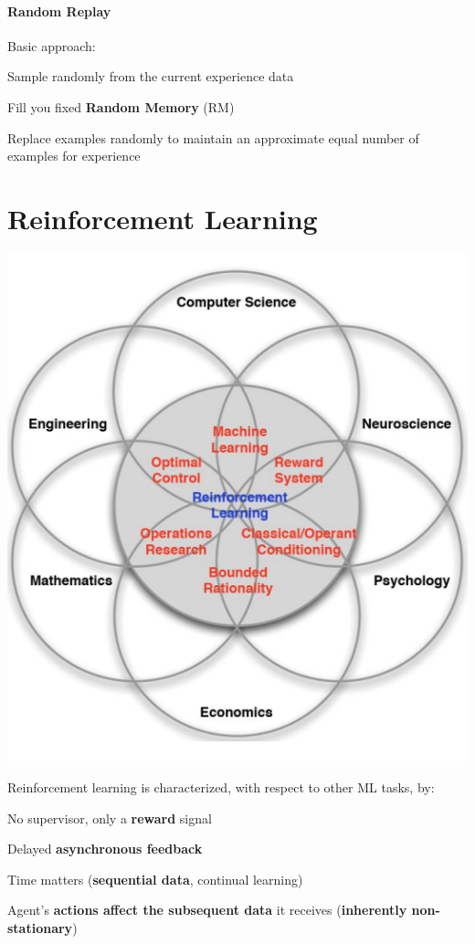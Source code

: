 \documentclass[10pt]{report}
\begin{document}
\paragraph{Random Replay} Basic approach:
\begin{list}{}{}
	\item Sample randomly from the current experience data
	\item Fill you fixed \textbf{Random Memory} (RM)
	\item Replace examples randomly to maintain an approximate equal number of examples for experience
\end{list}
\section{Reinforcement Learning}
\begin{center}
	\includegraphics[scale=0.5]{214.png}
\end{center}
Reinforcement learning is characterized, with respect to other ML tasks, by:
\begin{list}{}{}
	\item No supervisor, only a \textbf{reward} signal
	\item Delayed \textbf{asynchronous feedback}
	\item Time matters (\textbf{sequential data}, continual learning)
	\item Agent's \textbf{actions affect the subsequent data} it receives (\textbf{inherently non-stationary})
\end{list}
\end{document}
